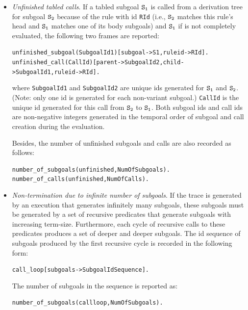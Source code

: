 \documentclass[11pt]{article}
\begin{document}
{\begin{itemize}
\item \emph{Unfinished tabled calls}.
  If a tabled subgoal $\tt S_1$ is called from a
  derivation tree for subgoal $\tt S_2$ because of the rule with id
  {\tt RId} (i.e., $\tt S_2$ matches this rule's head and $\tt S_1$
  matches one of its body subgoals) and $\tt S_1$ if is not completely
  evaluated, the
  following two frames are reported: 
\begin{alltt}
   unfinished\_subgoal(SubgoalId1)[subgoal->S1,ruleid->RId].\\
   unfinished\_call(CallId)[parent->SubgoalId2,child->SubgoalId1,ruleid->RId].
\end{alltt}
  where {\tt SubgoalId1} and {\tt SubgoalId2} are unique ids generated
  for $\tt S_1$ and $\tt S_2$. 
  (Note: only one id is generated for each non-variant subgoal.)
  {\tt CallId} is the unique id generated for this call from $\tt S_2$
  to $\tt S_1$. 
  Both subgoal ids and call ids are non-negative integers generated in the
  temporal order of subgoal and call creation during the evaluation.

  Besides, the number of unfinished subgoals and calls are also
  recorded as follows:
\begin{alltt}
   number\_of\_subgoals(unfinished,NumOfSubgoals).\\
   number\_of\_calls(unfinished,NumOfCalls).
\end{alltt}

\item \emph{Non-termination due to infinite number of subgoals}. 
  If the trace is generated by an execution that
  generates infinitely many
  subgoals, these subgoals must be generated by a set of
  recursive predicates that generate subgoals with increasing term-size.
  Furthermore, each cycle of recursive calls to these predicates
  produces a set of deeper and deeper subgoals.
  The id sequence of subgoals produced by the first recursive cycle is
  recorded in the following form:
\begin{alltt}
   call\_loop[subgoals->SubgoalIdSequence].
\end{alltt}
  The number of subgoals in the sequence is reported as:
\begin{alltt}
   number\_of\_subgoals(callloop,NumOfSubgoals).
\end{alltt}
  

\end{itemize}}
\end{document}
